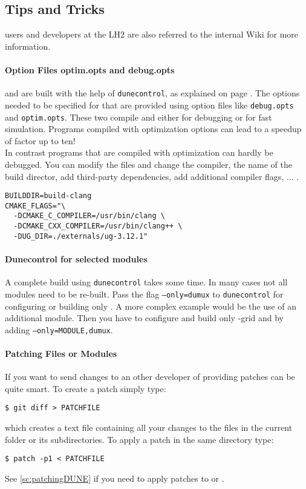\subsection{Tips and Tricks}
\Dumux users and developers at the LH2 are also referred to the internal Wiki for
more information.

\paragraph{Option Files optim.opts and debug.opts}
\Dune and \Dumux are built with the help of \texttt{dunecontrol}, as explained on page \pageref{buildIt}.
The options needed to be specified for that are provided using option files like
\texttt{debug.opts} and \texttt{optim.opts}. These two compile \Dune and \Dumux
either for debugging or for fast simulation. Programs compiled with optimization options
can lead to a speedup of factor up to ten!\\
In contrast programs that are compiled with optimization can hardly be debugged.
You can modify the files and change the compiler, the name of the build director,
add third-party dependencies, add additional compiler flags, ... .
\begin{lstlisting}[style=Shell]
BUILDDIR=build-clang
CMAKE_FLAGS="\
  -DCMAKE_C_COMPILER=/usr/bin/clang \
  -DCMAKE_CXX_COMPILER=/usr/bin/clang++ \
  -DUG_DIR=./externals/ug-3.12.1"
\end{lstlisting}

\paragraph{Dunecontrol for selected modules}
A complete build using \texttt{dunecontrol} takes some time. In many cases not all modules need to be re-built.
Pass the flag \texttt{--only=dumux} to \texttt{dunecontrol} for configuring or building only \Dumux. A more
complex example would be the use of an additional module. Then you have to configure and build only \Dune{}-grid
and \Dumux by adding \texttt{--only=MODULE,dumux}.

\paragraph{Patching Files or Modules}
If you want to send changes to an other developer of \Dumux providing patches
can be quite smart. To create a patch simply type:
\begin{lstlisting}[style=Bash]
$ git diff > PATCHFILE
\end{lstlisting}
\noindent which creates a text file containing all your changes to the files
in the current folder or its subdirectories.
To apply a patch in the same directory type:
\begin{lstlisting}[style=Bash]
$ patch -p1 < PATCHFILE
\end{lstlisting}
See \ref{sc:patchingDUNE} if you need to apply patches to \Dumux or \Dune.

